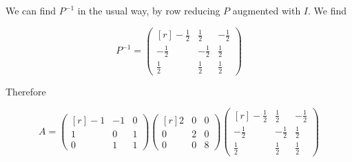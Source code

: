\documentclass[11pt]{amsart}
\begin{document}
We can find $P^{-1}$ in the usual way, by row reducing $P$ augmented with $I$. We find 

\[
P^{-1}=
\begin{pmatrix*}[r]
-\frac{1}{2}&\frac{1}{2}&-\frac{1}{2}\\
-\frac{1}{2}&-\frac{1}{2}&\frac{1}{2}\\
\frac{1}{2}&\frac{1}{2}&\frac{1}{2}
\end{pmatrix*}
\]

Therefore

\[
A=
\begin{pmatrix*}[r]
-1&-1&0\\
1&0&1\\
0&1&1
\end{pmatrix*}
\begin{pmatrix*}[r]
2&0&0\\
0&2&0\\
0&0&8
\end{pmatrix*}
\begin{pmatrix*}[r]
-\frac{1}{2}&\frac{1}{2}&-\frac{1}{2}\\
-\frac{1}{2}&-\frac{1}{2}&\frac{1}{2}\\
\frac{1}{2}&\frac{1}{2}&\frac{1}{2}
\end{pmatrix*}
\]
\end{document}
